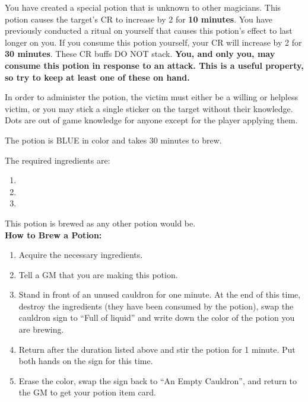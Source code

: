 \documentclass[green]{NeptuneBall}
\begin{document}
\name{\gBuff{}}

You have created a special potion that is unknown to other magicians. This potion causes the target's CR to increase by 2 for {\bf 10 minutes}.  You have previously conducted a ritual on yourself that causes this potion's effect to last longer on you. If you consume this potion yourself, your CR will increase by 2 for {\bf 30 minutes}. These CR buffs DO NOT stack. {\bf You, and only you, may consume this potion in response to an attack. This is a useful property, so try to keep at least one of these on hand.}

In order to administer the potion, the victim must either be a willing or helpless victim, or you may stick a single sticker on the target without their knowledge. Dots are out of game knowledge for anyone except for the player applying them.

The potion is BLUE in color and takes 30 minutes to brew. 

The required ingredients are:
\begin{enumerate}
\item \iManOfWar{}
\item \iTeeth{}
\item \iSwordfish{}
\end{enumerate}

This potion is brewed as any other potion would be.\\

{\bf How to Brew a Potion:}\\ %
\begin{enumerate}
  \item Acquire the necessary ingredients.
	\item Tell a GM that you are making this potion.
  \item Stand in front of an unused cauldron for one minute. At the end of this time, destroy the ingredients (they have been consumed by the potion), swap the cauldron sign to ``Full of liquid'' and write down the color of the potion you are brewing.
  \item Return after the duration listed above and stir the potion for 1 minute. Put both hands on the sign for this time.
  \item Erase the color, swap the sign back to ``An Empty Cauldron'', and return to the GM to get your potion item card.
\end{enumerate}
\end{document}
